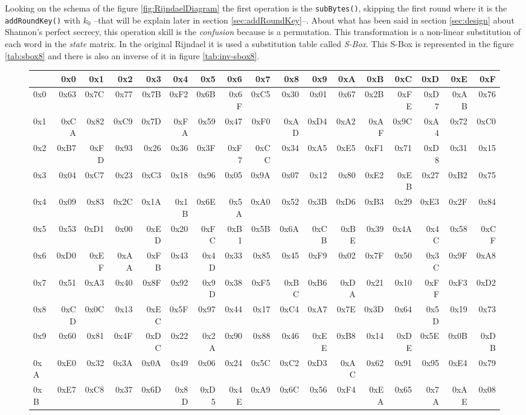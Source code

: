 \documentclass[10pt,a4paper,twoside]{llncs}
\begin{document}
Looking on the schema of the figure \ref{fig:RijndaelDiagram} the first operation is the {\tt subBytes()}, skipping the first round where it is the {\tt addRoundKey()} with $k_0$ --that will be explain later in section \ref{sec:addRoundKey}--. About what has been said in section \ref{sec:design} about Shannon's perfect secrecy, this operation skill is the \emph{confusion} because is a permutation. This transformation is a non-linear substitution of each word in the \emph{state} matrix. In the original Rijndael it is used a substitution table called \emph{S-Box}. This S-Box is represented in the figure \ref{tab:sbox8} and there is also an inverse of it in figure \ref{tab:inv-sbox8}.

\begin{figure}[ht]{\tiny
\begin{center}
\begin{tabular}[]{|l||r|r|r|r|r|r|r|r|r|r|r|r|r|r|r|r|}\hline
    & 0x0 &0x1 &0x2 &0x3 &0x4 &0x5 &0x6 &0x7 &0x8 &0x9 &0xA &0xB &0xC &0xD &0xE &0xF \\\hline\hline
0x0 & 0x63&0x7C&0x77&0x7B&0xF2&0x6B&0x6F&0xC5&0x30&0x01&0x67&0x2B&0xFE&0xD7&0xAB&0x76\\\hline
0x1 & 0xCA&0x82&0xC9&0x7D&0xFA&0x59&0x47&0xF0&0xAD&0xD4&0xA2&0xAF&0x9C&0xA4&0x72&0xC0 \\\hline
0x2 & 0xB7&0xFD&0x93&0x26&0x36&0x3F&0xF7&0xCC&0x34&0xA5&0xE5&0xF1&0x71&0xD8&0x31&0x15 \\\hline
0x3 & 0x04&0xC7&0x23&0xC3&0x18&0x96&0x05&0x9A&0x07&0x12&0x80&0xE2&0xEB&0x27&0xB2&0x75 \\\hline
0x4 & 0x09&0x83&0x2C&0x1A&0x1B&0x6E&0x5A&0xA0&0x52&0x3B&0xD6&0xB3&0x29&0xE3&0x2F&0x84 \\\hline
0x5 & 0x53&0xD1&0x00&0xED&0x20&0xFC&0xB1&0x5B&0x6A&0xCB&0xBE&0x39&0x4A&0x4C&0x58&0xCF \\\hline
0x6 & 0xD0&0xEF&0xAA&0xFB&0x43&0x4D&0x33&0x85&0x45&0xF9&0x02&0x7F&0x50&0x3C&0x9F&0xA8 \\\hline
0x7 & 0x51&0xA3&0x40&0x8F&0x92&0x9D&0x38&0xF5&0xBC&0xB6&0xDA&0x21&0x10&0xFF&0xF3&0xD2 \\\hline
0x8 & 0xCD&0x0C&0x13&0xEC&0x5F&0x97&0x44&0x17&0xC4&0xA7&0x7E&0x3D&0x64&0x5D&0x19&0x73 \\\hline
0x9 & 0x60&0x81&0x4F&0xDC&0x22&0x2A&0x90&0x88&0x46&0xEE&0xB8&0x14&0xDE&0x5E&0x0B&0xDB \\\hline
0xA & 0xE0&0x32&0x3A&0x0A&0x49&0x06&0x24&0x5C&0xC2&0xD3&0xAC&0x62&0x91&0x95&0xE4&0x79 \\\hline
0xB & 0xE7&0xC8&0x37&0x6D&0x8D&0xD5&0x4E&0xA9&0x6C&0x56&0xF4&0xEA&0x65&0x7A&0xAE&0x08 \\\hline

\end{tabular}
\end{center}}
\end{figure}
\end{document}

